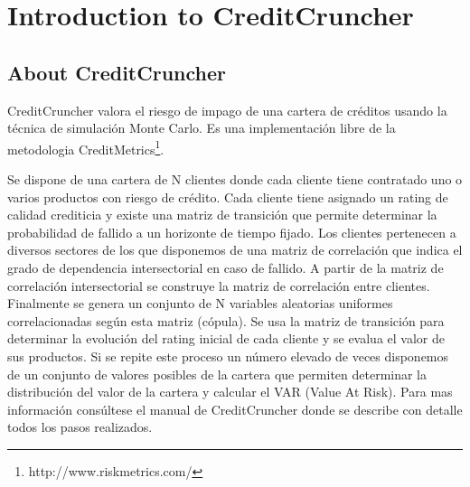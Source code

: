 
%
%
%
%
%
%
%
%

\chapter{Introduction to CreditCruncher}
\label{sec:introduction}

\section{About CreditCruncher}

CreditCruncher valora el riesgo de impago de una cartera de cr\'editos usando la 
t\'ecnica de simulaci\'on Monte Carlo. Es una implementaci\'on libre de la metodologia
CreditMetrics\footnote{http://www.riskmetrics.com/}. 

Se dispone de una cartera de N clientes donde cada cliente tiene contratado uno o 
varios productos con riesgo de cr\'edito. Cada cliente tiene asignado un rating de 
calidad crediticia y existe una matriz de transici\'on que permite determinar la 
probabilidad de fallido a un horizonte de tiempo fijado. Los clientes pertenecen 
a diversos sectores de los que disponemos de una matriz de correlaci\'on que 
indica el grado de dependencia intersectorial en caso de fallido. A partir de 
la matriz de correlaci\'on intersectorial se construye la matriz de correlaci\'on 
entre clientes. Finalmente se genera un conjunto de N variables aleatorias 
uniformes correlacionadas seg\'un esta matriz (c\'opula). Se usa la matriz de 
transici\'on para determinar la evoluci\'on del rating inicial de cada cliente y se 
evalua el valor de sus productos. Si se repite este proceso un n\'umero elevado de 
veces disponemos de un conjunto de valores posibles de la cartera que permiten 
determinar la distribuci\'on del valor de la cartera y calcular el VAR (Value At Risk). 
Para mas informaci\'on cons\'ultese el manual de CreditCruncher donde se describe 
con detalle todos los pasos realizados.

